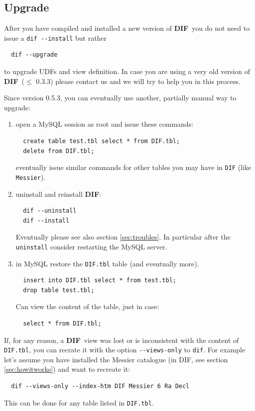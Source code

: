 \documentclass[10pt,titlepage]{article}
\newcommand{\dif}{\textbf{\small DIF}}
\begin{document}
\subsection{Upgrade}
\label{sec:upgradedif}
After you have compiled and installed a new version of \dif\ you do not need to issue a
\verb|dif --install| but rather
%
\begin{verbatim}
  dif --upgrade
\end{verbatim}
%
to upgrade UDFs and view definition. In case you are using a very old
version of \dif\ ($\le$ 0.3.3) please contact us and we will try to
help you in this process.
%

Since version 0.5.3, you can eventually use another, partially manual way to
upgrade:
%
\begin{enumerate}
\item open a MySQL session as root and issue these commands:
\begin{verbatim}
  create table test.tbl select * from DIF.tbl;
  delete from DIF.tbl;
\end{verbatim}
  eventually issue similar commands for other tables you may have in \verb|DIF|
  (like \verb|Messier|).
\item uninstall and reinstall \dif:
\begin{verbatim}
  dif --uninstall
  dif --install
\end{verbatim}
  Eventually please see also section \ref{sec:troubles}. In particular after
  the \verb|uninstall| consider restarting the MySQL server.
\item in MySQL restore the \verb|DIF.tbl| table (and eventually more).
\begin{verbatim}
  insert into DIF.tbl select * from test.tbl;
  drop table test.tbl;
\end{verbatim}
  Can view the content of the table, just in case:
\begin{verbatim}
  select * from DIF.tbl;
\end{verbatim}
\end{enumerate}
%
If, for any reason, a \dif\ view was lost or is inconsistent with the content
of \verb|DIF.tbl|, you can recrate it with the option \verb|--views-only| to
\texttt{dif}.
For example let's assume you have installed the Messier catalogue (in DIF, see
section \ref{sec:howitworks}) and want to recreate it:
\begin{verbatim}
  dif --views-only --index-htm DIF Messier 6 Ra Decl
\end{verbatim}
This can be done for any table listed in \verb|DIF.tbl|.
\end{document}
